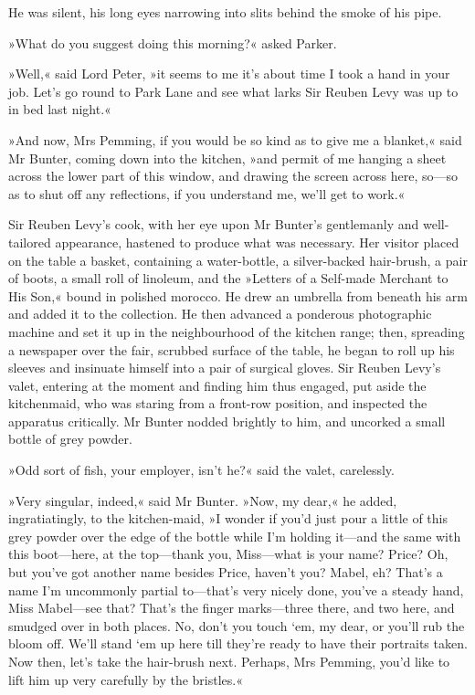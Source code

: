 He was silent, his long eyes narrowing into slits behind the smoke of his pipe.

»What do you suggest doing this morning?« asked Parker.

»Well,« said Lord Peter, »it seems to me it's about time I took a hand in your job. Let's go round to Park Lane and see what larks Sir Reuben Levy was up to in bed last night.«

»And now, Mrs Pemming, if you would be so kind as to give me a blanket,« said Mr Bunter, coming down into the kitchen, »and permit of me hanging a sheet across the lower part of this window, and drawing the screen across here, so—so as to shut off any reflections, if you understand me, we'll get to work.«

Sir Reuben Levy's cook, with her eye upon Mr Bunter's gentlemanly and well-tailored appearance, hastened to produce what was necessary. Her visitor placed on the table a basket, containing a water-bottle, a silver-backed hair-brush, a pair of boots, a small roll of linoleum, and the »Letters of a Self-made Merchant to His Son,« bound in polished morocco. He drew an umbrella from beneath his arm and added it to the collection. He then advanced a ponderous photographic machine and set it up in the neighbourhood of the kitchen range; then, spreading a newspaper over the fair, scrubbed surface of the table, he began to roll up his sleeves and insinuate himself into a pair of surgical gloves. Sir Reuben Levy's valet, entering at the moment and finding him thus engaged, put aside the kitchenmaid, who was staring from a front-row position, and inspected the apparatus critically. Mr Bunter nodded brightly to him, and uncorked a small bottle of grey powder.

»Odd sort of fish, your employer, isn't he?« said the valet, carelessly.

»Very singular, indeed,« said Mr Bunter. »Now, my dear,« he added, ingratiatingly, to the kitchen-maid, »I wonder if you'd just pour a little of this grey powder over the edge of the bottle while I'm holding it—and the same with this boot—here, at the top—thank you, Miss—what is your name? Price? Oh, but you've got another name besides Price, haven't you? Mabel, eh? That's a name I'm uncommonly partial to—that's very nicely done, you've a steady hand, Miss Mabel—see that? That's the finger marks—three there, and two here, and smudged over in both places. No, don't you touch `em, my dear, or you'll rub the bloom off. We'll stand `em up here till they're ready to have their portraits taken. Now then, let's take the hair-brush next. Perhaps, Mrs Pemming, you'd like to lift him up very carefully by the bristles.«

